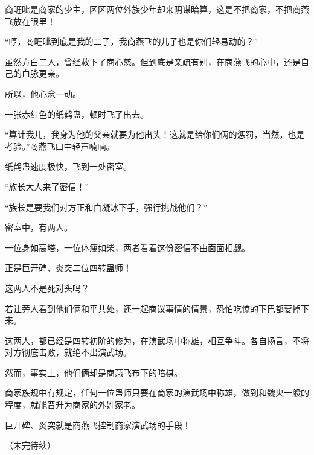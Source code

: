 \begin{this_body}
商睚眦是商家的少主，区区两位外族少年却来阴谋暗算，这是不把商家，不把商燕飞放在眼里！

“哼，商睚眦到底是我的二子，我商燕飞的儿子也是你们轻易动的？”

虽然方白二人，曾经救下了商心慈。但到底是亲疏有别，在商燕飞的心中，还是自己的血脉更亲。

所以，他心念一动。

一张赤红色的纸鹤蛊，顿时飞了出去。

“算计我儿，我身为他的父亲就要为他出头！这就是给你们俩的惩罚，当然，也是考验。”商燕飞口中轻声喃喃。

纸鹤蛊速度极快，飞到一处密室。

“族长大人来了密信！”

“族长是要我们对方正和白凝冰下手，强行挑战他们？”

密室中，有两人。

一位身如高塔，一位体瘦如柴，两者看着这份密信不由面面相觑。

正是巨开碑、炎突二位四转蛊师！

这两人不是死对头吗？

若让旁人看到他们俩和平共处，还一起商议事情的情景，恐怕吃惊的下巴都要掉下来。

这两人，都已经是四转初阶的修为，在演武场中称雄，相互争斗。各自扬言，不将对方彻底击败，就绝不出演武场。

然而，事实上，他们俩却是商燕飞布下的暗棋。

商家族规中有规定，任何一位蛊师只要在商家的演武场中称雄，做到和魏央一般的程度，就能晋升为商家的外姓家老。

巨开碑、炎突就是商燕飞控制商家演武场的手段！

（未完待续）

\end{this_body}


